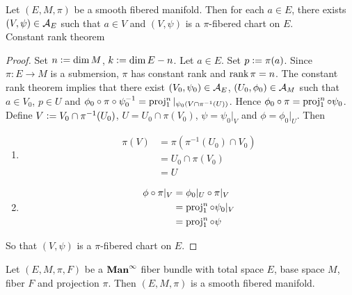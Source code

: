 \documentclass{book}
\begin{document}
\begin{ex}
	Let $(E, M, \pi)$ be a smooth fibered manifold. Then for each $a \in E$, there exists $(V, \psi) \in \mathcal{A}_E$ such that $a \in V$ and $(V, \psi)$ is a $\pi$-fibered chart on $E$. \\
	 Constant rank theorem
\end{ex}

\begin{proof}
	Set $n \vcentcolon= \dim M$, $k \vcentcolon= \dim E - n$. Let $a \in E$. Set $p \vcentcolon= \pi(a)$. Since $\pi:E \rightarrow M$ is a submersion, $\pi$ has constant rank and $\operatorname{\text{rank}} \pi = n$. The constant rank theorem implies that there exist $(V_0, \psi_0) \in \mathcal{A}_E$, $(U_0, \phi_0) \in \mathcal{A}_M$ such that $a \in V_0$, $p \in U$ and $\phi_0 \circ \pi \circ \psi_0^{-1} = \operatorname{\text{proj}}^n_1|_{\psi_0(V \cap \pi^{-1}(U))}$. Hence $\phi_0 \circ \pi = \operatorname{\text{proj}}^n_1 \circ \psi_0 $. Define $V \vcentcolon= V_0 \cap \pi^{-1}(U_0)$, $U = U_0 \cap \pi(V_0)$, $\psi = \psi_0|_V$ and $\phi = \phi_0|_U$. Then 
	\begin{enumerate}
		\item 
		\begin{align*}
			\pi(V)
			& = \pi(\pi^{-1}(U_0) \cap V_0) \\
			& = U_0 \cap \pi(V_0) \\
			& = U
		\end{align*}
		\item 
		\begin{align*}
			\phi \circ \pi|_V
			& = \phi_0|_U \circ \pi|_V  \\
			& = \operatorname{\text{proj}}^n_1 \circ \psi_0|_V \\
			& = \operatorname{\text{proj}}^n_1 \circ \psi
		\end{align*}
	\end{enumerate}
	So that $(V, \psi)$ is a $\pi$-fibered chart on $E$. 
\end{proof}

\begin{ex}
	Let $(E, M, \pi, F)$ be a $\operatorname*{\text{\textbf{Man}}^{\infty}}$ fiber bundle with total space $E$, base space $M$, fiber $F$ and projection $\pi$. Then $(E, M, \pi)$ is a smooth fibered manifold. 
\end{ex}
\end{document}
